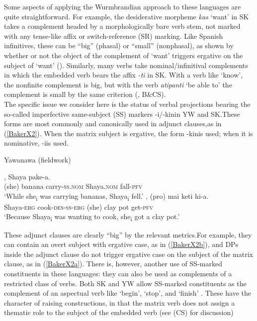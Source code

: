 \documentclass[output=paper,colorlinks,citecolor=brown,
]{langscibook}
\renewcommand{\sc}[1]{\textsc{#1}}
\begin{document}
Some aspects of applying the Wurmbrandian approach to these languages are quite straightforward. For example, the desiderative morpheme \textit{kas} `want’ in SK takes a complement headed by a morphologically bare verb stem, not marked with any tense-like affix or switch-reference (SR) marking. Like Spanish infinitives, these can be “big” (phasal) or “small” (nonphasal), as shown by whether or not the object of the complement of `want’ triggers ergative on the subject of `want’ (\citealt[371-376]{baker2014dependent}). Similarly, many verbs take nominal/infinitival complements in which the embedded verb bears the affix \textit{-ti} in SK. With a verb like `know’, the nonfinite complement is big, but with the verb \textit{atipanti} `be able to’ the complement is small by the same criterion (\citealt[17]{baker2020agree}, B\&CS).\\

The specific issue we consider here is the status of verbal projections bearing the so-called imperfective same-subject (SS) markers -i/-kinin YW and SK.These forms are most commonly and canonically used in adjunct clauses,as in (\ref{BakerX2}). When the matrix subject is ergative, the form -kinis used; when it is nominative, -iis used.

\begin{exe}
    \ex Yawanawa (fieldwork) \label{BakerX2}
	    \begin{xlist}
			\ex \label{BakerX2a}
			, Shaya pake-a.\\
			     (she) banana carry-\sc{ss.nom} Shaya.\sc{nom} fall-\sc{pfv}\\
			    \glt `While she\textsubscript{i} was carrying bananas, Shaya\textsubscript{i} fell.'
			\ex \label{BakerX2b}
			, (pro) mai  keti  hi-a.\\
    			 Shaya-\sc{erg} cook-\sc{des-ss-erg} (she) clay pot get-\sc{pfv}\\
			    \glt `Because Shaya\textsubscript{i} was wanting to cook, she\textsubscript{i} got a clay pot.'
		\end{xlist}
\end{exe}

These adjunct clauses are clearly “big” by the relevant metrics.For example, they can contain an overt subject with ergative case, as in (\ref{BakerX2b}), and DPs inside the adjunct clause do not trigger ergative case on the subject of the matrix clause, as in (\ref{BakerX2a}). There is, however, another use of SS-marked constituents in these languages: they can also be used as complements of a restricted class of verbs. Both SK and YW allow SS-marked constituents as the complement of an aspectual verb like ‘begin’, ‘stop’, and ‘finish’ \citep[319]{valenzuela2003transitivity}. These have the character of raising constructions, in that the matrix verb does not assign a thematic role to the subject of the embedded verb (see \citealt{camargosouza2020switch} (CS) for discussion)
\end{document}

